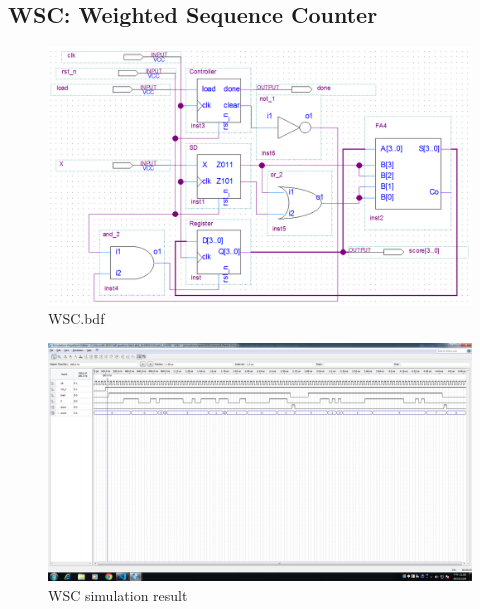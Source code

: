 \documentclass[12pt,a4paper]{article}
\begin{document}
  \subsection{WSC: Weighted Sequence Counter}
  \begin{figure}[H]
    \centering
    \includegraphics[width=\linewidth]{Lab2_3/WSC_bdf.png}
    \caption{WSC.bdf}
  \end{figure}
  \begin{figure}[H]
    \centering
    \includegraphics[width=\linewidth]{Lab2_3/WSC_simulation.png}
    \caption{WSC simulation result}
  \end{figure}
\end{document}
